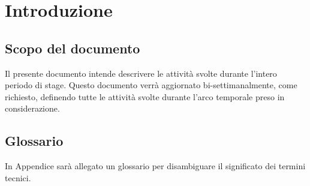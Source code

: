 \section{Introduzione}
\subsection{Scopo del documento}
Il presente documento intende descrivere le attività svolte durante l'intero periodo di stage. Questo
documento verrà aggiornato bi-settimanalmente, come richiesto, definendo tutte le attività svolte durante l'arco temporale preso in considerazione.
\subsection{Glossario}
In Appendice sarà allegato un glossario per disambiguare il significato dei termini tecnici.
\newpage

